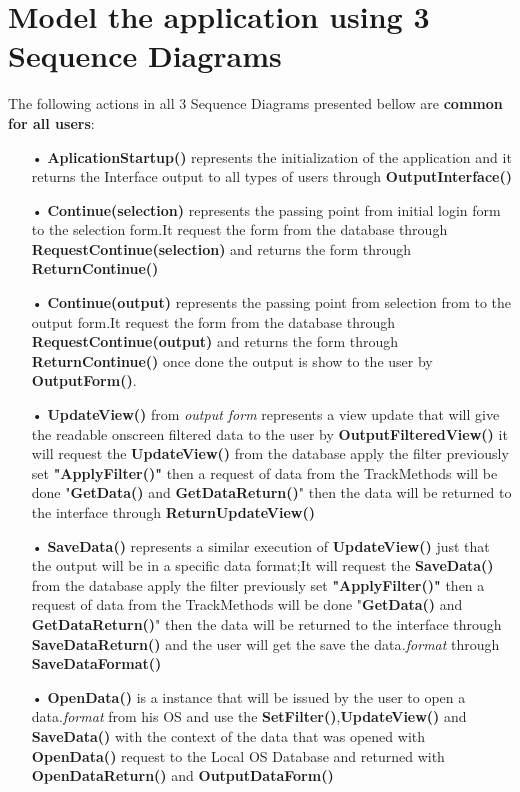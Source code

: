 \setlength{\parindent}{2ex}
\section{Model the application using 3 Sequence Diagrams}
The following actions in all 3 Sequence Diagrams presented bellow are \textbf{common for all users}:\par
\begin{enumerate}
\item[•] \textbf{AplicationStartup()} represents the initialization of the application and it returns the Interface output to all types of users through \textbf{OutputInterface()}
\item[•] \textbf{Continue(selection)} represents the passing point from initial login form to the selection form.It request the form from the database through \textbf{RequestContinue(selection)} and returns the form through \textbf{ReturnContinue()}
\item[•] \textbf{Continue(output)} represents the passing point from selection from to the output form.It request the form from the database through \textbf{RequestContinue(output)} and returns the form through \textbf{ReturnContinue()}
once done the output is show to the user by \textbf{OutputForm()}.
\item[•] \textbf{UpdateView()} from \textit{output form} represents a view update that will give the readable onscreen filtered data to the user by \textbf{OutputFilteredView()} it will request the \textbf{UpdateView()} from the database apply the filter previously set \textbf{"ApplyFilter()"} then a request of data from the TrackMethods will be done "\textbf{GetData()} and \textbf{GetDataReturn()}" then the data will be returned to the interface through \textbf{ReturnUpdateView()}
\item[•] \textbf{SaveData()} represents a similar execution of \textbf{UpdateView()} just that the output will be in a specific data format;It will request the \textbf{SaveData()} from the database apply the filter previously set \textbf{"ApplyFilter()"} then a request of data from the TrackMethods will be done "\textbf{GetData()} and \textbf{GetDataReturn()}" then the data will be returned to the interface through \textbf{SaveDataReturn()} and the user will get the save the data\textit{.format} through \textbf{SaveDataFormat()}  
\item[•] \textbf{OpenData()} is a instance that will be issued by the user to open a data.\textit{format} from his OS and use the \textbf{SetFilter()},\textbf{UpdateView()} and \textbf{SaveData()} with the context of the data that was opened with \textbf{OpenData()} request to the Local OS Database and returned with \textbf{OpenDataReturn()} and \textbf{OutputDataForm()}
\end{enumerate}

